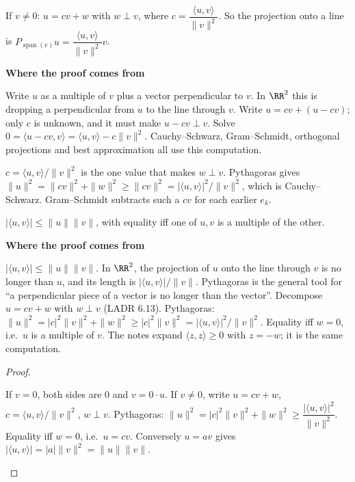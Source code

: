 \documentclass[10pt]{scrartcl}
\newenvironment{fig}{\par\needspace{9\baselineskip}\medskip\begin{center}}{\end{center}\medskip}
\newcommand{\figcap}[1]{\par\vspace{3pt}\begin{minipage}{0.86\linewidth}\small\centering #1\end{minipage}}
\DeclareMathOperator{\spn}{span}
\newcommand{\ip}[2]{\langle #1,#2\rangle}
\newenvironment{motive}{\begin{mdframed}[style=thinkbox]\textbf{\color{OliveGreen!75!black}Where the proof comes from}\begin{description}[leftmargin=0.9em,labelindent=0pt,itemsep=2pt,topsep=2pt,font=\normalfont\bfseries\color{OliveGreen!70!black}]}{\end{description}\end{mdframed}}
\newenvironment{steps}{\begin{enumerate}[label=\arabic*.,leftmargin=1.5em,itemsep=2pt,topsep=2pt]}{\end{enumerate}}
\begin{document}
\begin{proposition*}
  If $v\ne0$: $u=cv+w$ with $w\perp v$, where $c=\dfrac{\ip uv}{\|v\|^2}$. So the projection onto a line is $P_{\spn(v)}u=\dfrac{\ip uv}{\|v\|^2}v$.
\end{proposition*}
\begin{motive}
  \ii[Want.] Write $u$ as a multiple of $v$ plus a vector perpendicular to $v$. In $\RR^2$ this is dropping a perpendicular from $u$ to the line through $v$.
   Write $u=cv+(u-cv)$; only $c$ is unknown, and it must make $u-cv\perp v$. Solve $0=\ip{u-cv}v=\ip uv-c\|v\|^2$.
   Cauchy--Schwarz, Gram--Schmidt, orthogonal projections and best approximation all use this computation.
\end{motive}
\begin{fig}
\figcap{$c=\ip uv/\|v\|^2$ is the one value that makes $w\perp v$. Pythagoras gives $\|u\|^2=\|cv\|^2+\|w\|^2\ge\|cv\|^2=|\ip uv|^2/\|v\|^2$, which is Cauchy--Schwarz. Gram--Schmidt subtracts such a $cv$ for each earlier $e_k$.}
\end{fig}

\begin{theorem*}
  $|\ip uv|\le\|u\|\|v\|$, with equality iff one of $u,v$ is a multiple of the other.
\end{theorem*}
\begin{motive}
  \ii[Want.] $|\ip uv|\le\|u\|\|v\|$.
  \ii[Know.] In $\RR^2$, the projection of $u$ onto the line through $v$ is no longer than $u$, and its length is $|\ip uv|/\|v\|$. Pythagoras is the general tool for ``a perpendicular piece of a vector is no longer than the vector''.
   Decompose $u=cv+w$ with $w\perp v$ (LADR 6.13). Pythagoras: $\|u\|^2=|c|^2\|v\|^2+\|w\|^2\ge|c|^2\|v\|^2=|\ip uv|^2/\|v\|^2$. Equality iff $w=0$, i.e.\ $u$ is a multiple of $v$.
   The notes expand $\ip zz\ge0$ with $z=-w$; it is the same computation.
\end{motive}
\begin{proof}
  \begin{steps}
    \ii If $v=0$, both sides are $0$ and $v=0\cdot u$.
    \ii If $v\ne0$, write $u=cv+w$, $c=\ip uv/\|v\|^2$, $w\perp v$. Pythagoras: $\|u\|^2=|c|^2\|v\|^2+\|w\|^2\ge\dfrac{|\ip uv|^2}{\|v\|^2}$.
    \ii Equality iff $w=0$, i.e.\ $u=cv$. Conversely $u=av$ gives $|\ip uv|=|a|\|v\|^2=\|u\|\|v\|$.
  \end{steps}
\end{proof}
\end{document}

